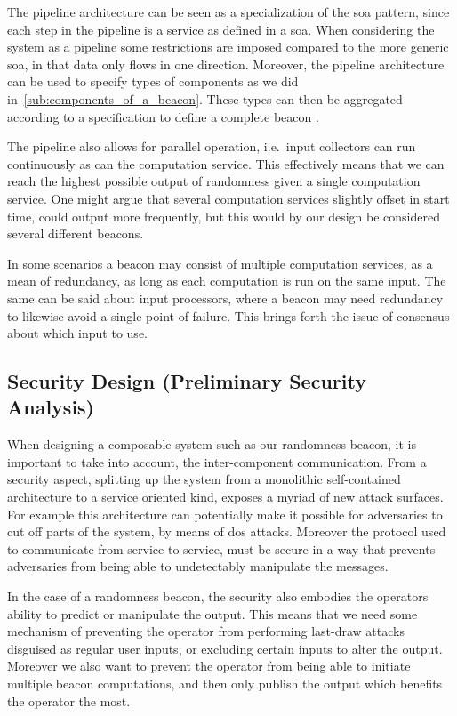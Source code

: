 The pipeline architecture can be seen as a specialization of the \gls{soa} pattern, since each step in the pipeline is a service as defined in a \gls{soa}.
When considering the system as a pipeline some restrictions are imposed compared to the more generic \gls{soa}, in that data only flows in one direction.
Moreover, the pipeline architecture can be used to specify types of components as we did in~\vref{sub:components_of_a_beacon}. These types can then be aggregated according to a specification to define a complete beacon .

The pipeline also allows for parallel operation, i.e.\ input collectors can run continuously as can the computation service.
This effectively means that we can reach the highest possible output of randomness given a single computation service.
One might argue that several computation services slightly offset in start time, could output more frequently, but this would by our design be considered several different beacons.

In some scenarios a beacon may consist of multiple computation services, as a mean of redundancy, as long as each computation is run on the same input.
The same can be said about input processors, where a beacon may need redundancy to likewise avoid a single point of failure.
This brings forth the issue of consensus about which input to use.

\subsection{Security Design (Preliminary Security Analysis)}
When designing a composable system such as our randomness beacon, it is important to take into account, the inter-component communication.
From a security aspect, splitting up the system from a monolithic self-contained architecture to a service oriented kind, exposes a myriad of new attack surfaces.
For example this architecture can potentially make it possible for adversaries to cut off parts of the system, by means of \gls{dos} attacks.
Moreover the protocol used to communicate from service to service, must be secure in a way that prevents adversaries from being able to undetectably manipulate the messages.


In the case of a randomness beacon, the security also embodies the operators ability to predict or manipulate the output.
This means that we need some mechanism of preventing the operator from performing last-draw attacks disguised as regular user inputs, or excluding certain inputs to alter the output.
Moreover we also want to prevent the operator from being able to initiate multiple beacon computations, and then only publish the output which benefits the operator the most.

